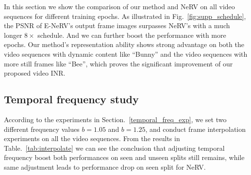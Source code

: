 \documentclass[runningheads]{llncs}
\begin{document}
In this section we show the comparison of our method and NeRV on all video sequences for different training epochs. As illustrated in Fig.~\ref{fig:supp_schedule}, the PSNR of E-NeRV's output frame images surpasses NeRV's with a much longer $8\times$ schedule. And we can further boost the performance with more epochs. Our method's representation ability shows strong advantage on both the video sequences with dynamic content like ``Bunny'' and the video sequences with more still frames like ``Bee'', which proves the significant improvement of our proposed video INR.

\subsection{Temporal frequency study}

According to the experiments in Section.~\ref{temporal_freq_exp}, we set two different frequency values $b=1.05$ and $b=1.25$, and conduct frame interpolation experiments on all the video sequences. From the results in Table.~\ref{tab:interpolate} we can see the conclusion that adjusting temporal frequency boost both performances on seen and unseen splits still remains, while same adjustment leads to performance drop on seen split for NeRV.
\end{document}
